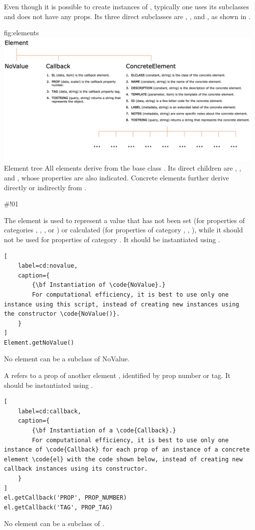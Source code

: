 \documentclass{tufte-handout}
\begin{document}
Even though it is possible to create instances of , typically one uses its subclasses and does not have any props.
Its three direct subclasses are , , and , as shown in .

	{fig:elements}
	{\includegraphics{fig01_big.jpg}}
	{Element tree}
	{
	All elements derive from the base class . 
	Its direct children are , , and , whose properties are also indicated.
	Concrete elements further derive directly or indirectly from .
	}

#!01

The element  is used to represent a value that has not been set (for properties of categories , , ,  or ) or calculated (for properties of category , , ), while it should not be used for properties of category .
It should be instantiated using .
%
\begin{lstlisting}[
	label=cd:novalue,
	caption={
		{\bf Instantiation of \code{NoValue}.}
		For computational efficiency, it is best to use only one instance using this script, instead of creating new instances using the constructor \code{NoValue()}. 
	}
]
Element.getNoValue()
\end{lstlisting}
%
No element can be a subclass of NoValue.
  
A  refers to a prop of another element , identified by prop number or tag.
It should be instantiated using .
%
\begin{lstlisting}[
	label=cd:callback,
	caption={
		{\bf Instantiation of a \code{Callback}.}
		For computational efficiency, it is best to use only one instance of \code{Callback} for each prop of an instance of a concrete element \code{el} with the code shown below, instead of creating new callback instances using its constructor. 
	}
]
el.getCallback('PROP', PROP_NUMBER)
el.getCallback('TAG', PROP_TAG)
\end{lstlisting}
%
No element can be a subclass of .
\end{document}
